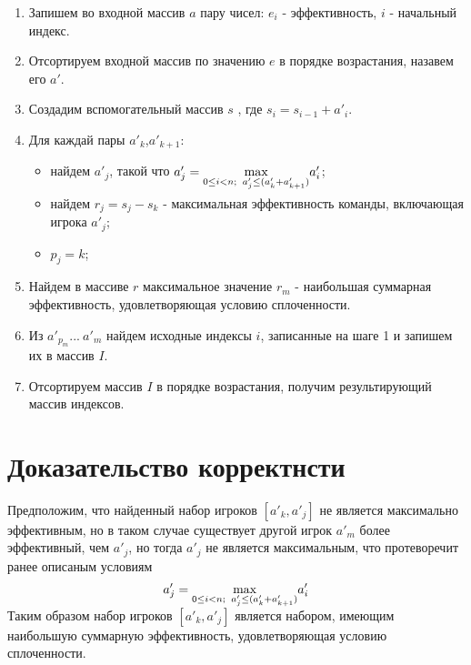 \documentclass[12pt]{article}
\begin{document}
\begin{enumerate}

\item Запишем во входной массив $a$ пару чисел: $e_i$ - эффективность, $i$ - начальный индекс.

\item Отсортируем входной массив по значению $e$ в порядке возрастания, назавем его $a'$.

\item Создадим вспомогательный массив $s$ , где $s_i = s_{i-1} + a'_i$.

\item Для каждай пары $a'_k$,$a'_{k+1}$:

	\begin{itemize}
	
	\item найдем $a'_j$, такой что $a'_j = \smash{\displaystyle\max_{0\le i < n;\;\; a'_j \leq (a'_k + a'_{k+1})}} a'_i$;

	\item найдем $r_j = s_j - s_k$ - максимальная эффективность команды, включающая игрока $a'_j$;
	
	\item $p_j = k$;
	
	\end{itemize}

\item Найдем в массиве $r$ максимальное значение $r_m$ - наибольшая суммарная эффективность, удовлетворяющая условию сплоченности.

\item Из $a'_{p_m} ...\ a'_m$ найдем исходные индексы $i$, записанные на шаге 1 и запишем их в массив $I$.

\item Отсортируем массив $I$ в порядке возрастания, получим результирующий массив индексов.
	
\end{enumerate}
	



\section{Доказательство корректнсти}
Предположим, что найденный набор игроков $[a'_k, a'_j]$ не является максимально эффективным, но в таком случае существует другой игрок $a'_m$ более эффективный, чем  $a'_j$, но тогда $a'_j$ не является максимальным, что протеворечит ранее описаным условиям 
$$a'_j = \smash{\displaystyle\max_{0\le i < n;\;\; a'_j \leq (a'_k + a'_{k+1})}} a'_i$$
Таким образом набор игроков $[a'_k, a'_j]$ является набором, имеющим наибольшую суммарную эффективность, удовлетворяющая условию сплоченности.
\end{document}
